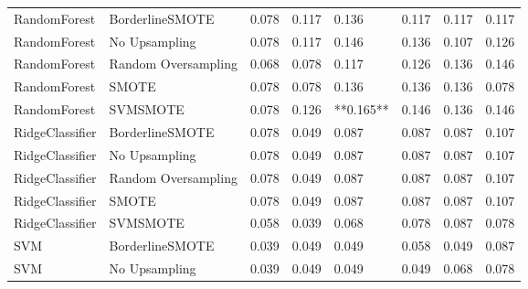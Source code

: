 \begin{tabular}{llllllll}
                RandomForest &     BorderlineSMOTE & 0.078 &                     0.117 &                 0.136 &                  0.117 &                                   0.117 &    0.117 \\
                RandomForest &       No Upsampling & 0.078 &                     0.117 &                 0.146 &                  0.136 &                                   0.107 &    0.126 \\
                RandomForest & Random Oversampling & 0.068 &                     0.078 &                 0.117 &                  0.126 &                                   0.136 &    0.146 \\
                RandomForest &               SMOTE & 0.078 &                     0.078 &                 0.136 &                  0.136 &                                   0.136 &    0.078 \\
                RandomForest &            SVMSMOTE & 0.078 &                     0.126 &             **0.165** &                  0.146 &                                   0.136 &    0.146 \\
             RidgeClassifier &     BorderlineSMOTE & 0.078 &                     0.049 &                 0.087 &                  0.087 &                                   0.087 &    0.107 \\
             RidgeClassifier &       No Upsampling & 0.078 &                     0.049 &                 0.087 &                  0.087 &                                   0.087 &    0.107 \\
             RidgeClassifier & Random Oversampling & 0.078 &                     0.049 &                 0.087 &                  0.087 &                                   0.087 &    0.107 \\
             RidgeClassifier &               SMOTE & 0.078 &                     0.049 &                 0.087 &                  0.087 &                                   0.087 &    0.107 \\
             RidgeClassifier &            SVMSMOTE & 0.058 &                     0.039 &                 0.068 &                  0.078 &                                   0.087 &    0.078 \\
                         SVM &     BorderlineSMOTE & 0.039 &                     0.049 &                 0.049 &                  0.058 &                                   0.049 &    0.087 \\
                         SVM &       No Upsampling & 0.039 &                     0.049 &                 0.049 &                  0.049 &                                   0.068 &    0.078 \\

\end{tabular}
